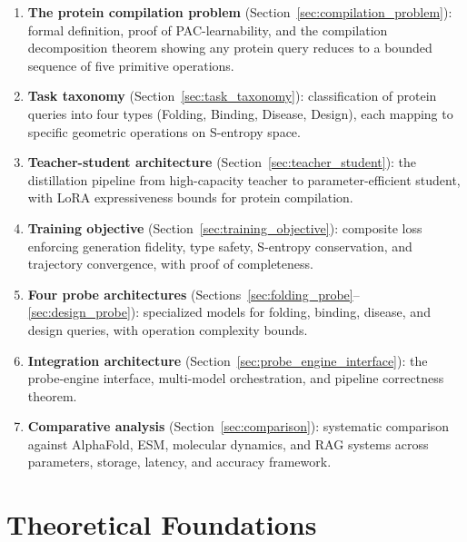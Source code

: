 \documentclass[11pt,twocolumn,a4paper]{article}
\theoremstyle{definition}
\theoremstyle{remark}
\begin{document}
\begin{enumerate}
    \item \textbf{The protein compilation problem} (Section~\ref{sec:compilation_problem}): formal definition, proof of PAC-learnability, and the compilation decomposition theorem showing any protein query reduces to a bounded sequence of five primitive operations.

    \item \textbf{Task taxonomy} (Section~\ref{sec:task_taxonomy}): classification of protein queries into four types (Folding, Binding, Disease, Design), each mapping to specific geometric operations on S-entropy space.

    \item \textbf{Teacher-student architecture} (Section~\ref{sec:teacher_student}): the distillation pipeline from high-capacity teacher to parameter-efficient student, with LoRA expressiveness bounds for protein compilation.

    \item \textbf{Training objective} (Section~\ref{sec:training_objective}): composite loss enforcing generation fidelity, type safety, S-entropy conservation, and trajectory convergence, with proof of completeness.

    \item \textbf{Four probe architectures} (Sections~\ref{sec:folding_probe}--\ref{sec:design_probe}): specialized models for folding, binding, disease, and design queries, with operation complexity bounds.

    \item \textbf{Integration architecture} (Section~\ref{sec:probe_engine_interface}): the probe-engine interface, multi-model orchestration, and pipeline correctness theorem.

    \item \textbf{Comparative analysis} (Section~\ref{sec:comparison}): systematic comparison against AlphaFold, ESM, molecular dynamics, and RAG systems across parameters, storage, latency, and accuracy framework.
\end{enumerate}

\section{Theoretical Foundations}
\label{sec:foundations}
\end{document}
